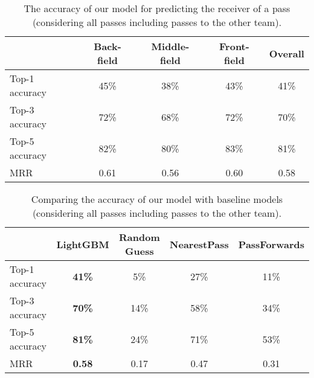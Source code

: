 \begin{table}[!t]
\caption{The accuracy of our model for predicting the receiver of a pass (considering all passes including passes to the other team).}
\centering
\renewcommand{\tabcolsep}{3pt}
\begin{tabular}{lcccc}
  \toprule
  & Back-field & Middle-field & Front-field & Overall \\
  \midrule
  Top-1 accuracy & 45\% & 38\% & 43\% & 41\% \\
  Top-3 accuracy & 72\% & 68\% & 72\% & 70\% \\
  Top-5 accuracy & 82\% & 80\% & 83\% & 81\% \\
  MRR & 0.61 & 0.56 & 0.60 & 0.58 \\
  \bottomrule
\end{tabular}
\label{tab:performance-all-passes}
\end{table}

\begin{table}[!t]
\caption{Comparing the accuracy of our model with baseline models (considering all passes including passes to the other team).}
\centering
\renewcommand{\tabcolsep}{3pt}
\begin{tabular}{lcccc}
  \toprule
  & LightGBM & Random Guess & NearestPass & PassForwards \\
  \midrule
  Top-1 accuracy & \textbf{41\%} & 5\% & 27\% & 11\% \\
  Top-3 accuracy & \textbf{70\%} & 14\% & 58\% & 34\% \\
  Top-5 accuracy & \textbf{81\%} & 24\% & 71\% & 53\% \\
  MRR & \textbf{0.58} & 0.17 & 0.47 & 0.31 \\
  \bottomrule
\end{tabular}
\label{tab:comparing-performance-all-passes}
\end{table}

